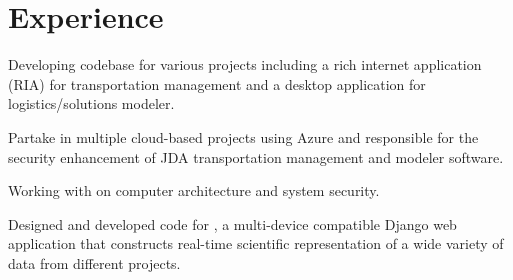 \documentclass[]{deedy_format_Hien}
\begin{document}
\hfill
\begin{minipage}[t]{0.66\textwidth} 
%
%


\section{Experience}
\vspace{3mm}
\justify
\begin{tightemize}
\item Developing codebase for various projects including a rich internet application (RIA) for transportation management and a desktop application for logistics/solutions modeler.  
\item Partake in multiple cloud-based projects using Azure and responsible for the security enhancement of JDA transportation management and modeler software.  
\end{tightemize}
\vspace{\topsep}
\sectionsep

\justify
\begin{tightemize}
\item Working with  on computer architecture and system security.
\end{tightemize}
\vspace{\topsep}
\sectionsep

\justify
\begin{tightemize}
\item Designed and developed  code for , a multi-device compatible Django web application that constructs real-time scientific representation of a wide variety of data from different projects.
\end{tightemize}
\vspace{\topsep}
\sectionsep


\end{minipage}
\end{document}
